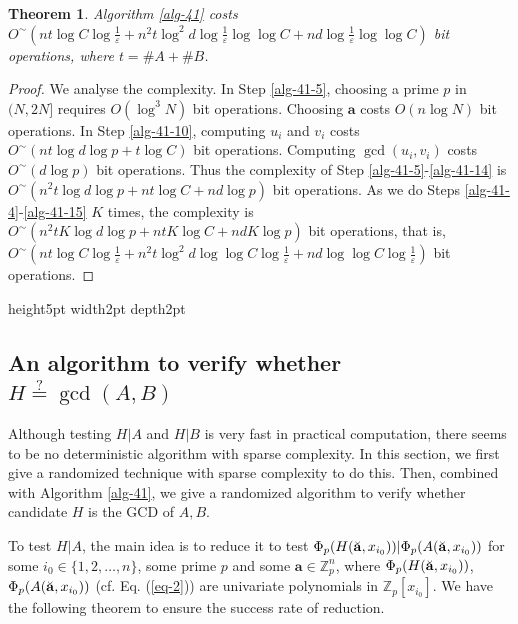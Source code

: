 \documentclass[final,20pt]{elsarticle}
\newtheorem{theorem}{Theorem}[section]
\def\Z{{\mathbb Z}}
\def\qed{\hfil {\vrule height5pt width2pt depth2pt}}
\begin{document}
\begin{theorem}\label{the-17}
Algorithm \ref{alg-41} costs $O^\sim(nt\log C\log\frac{1}{\varepsilon}+n^2t\log^2 d\log\frac{1}{\varepsilon}\log\log C+nd\log\frac{1}{\varepsilon}\log\log C)$ bit operations, where $t=\#A+\#B$.
\end{theorem}
\begin{proof}
We analyse the complexity.
In Step \ref{alg-41-5}, choosing a prime $p$ in $(N,2N]$ requires $O(\log^3N)$ bit operations. Choosing $\mathbf{a}$ costs $O(n\log N)$ bit operations.
%
In Step \ref{alg-41-10}, computing $u_i$ and $v_i$ costs $O^\sim(nt\log d\log p+t\log C)$
bit operations. Computing $\gcd(u_i,v_i)$ costs $O^\sim(d\log p)$ bit operations. Thus the complexity of Step \ref{alg-41-5}-\ref{alg-41-14} is $O^\sim(n^2t\log d\log p+nt\log C+nd\log p)$ bit operations.
%
As we do Steps \ref{alg-41-4}-\ref{alg-41-15} $K$ times, the complexity is $O^\sim(n^2tK\log d\log p+ntK\log C+ndK\log p)$ bit operations, that  is, $O^\sim(nt\log C\log \frac{1}{\varepsilon}+n^2t\log^2 d\log\log C\log\frac{1}{\varepsilon}+nd\log\log C\log\frac{1}{\varepsilon})$ bit operations.
\end{proof}\qed



\subsection{An algorithm to verify whether $H\overset{\text{?}}=\gcd(A,B)$}\label{section-4-1}
Although testing $H|A$ and $H|B$ is very fast in practical computation, there seems to be no deterministic algorithm with sparse complexity.
In this section, we first give a randomized technique with sparse complexity to do this.
%
Then, combined with Algorithm \ref{alg-41}, we give a randomized algorithm to verify whether candidate $H$ is the GCD of $A,B$.


To test $H|A$, the main idea is to reduce it to test $\Phi_p(H(\Breve{\mathbf{a}},x_{i_0})) | \Phi_p(A(\Breve{\mathbf{a}},x_{i_0}))$ for some $i_0\in\{1,2,\dots,n\}$, some prime $p$ and some $\mathbf{a}\in\Z_p^n$, where
$\Phi_p(H(\Breve{\mathbf{a}},x_{i_0}))$, $\Phi_p(A(\Breve{\mathbf{a}},x_{i_0}))$ (cf. Eq. (\ref{eq-2}))
are univariate polynomials in $\Z_p[x_{i_0}]$.
%
We have the following theorem to ensure the success rate of reduction.
\end{document}
